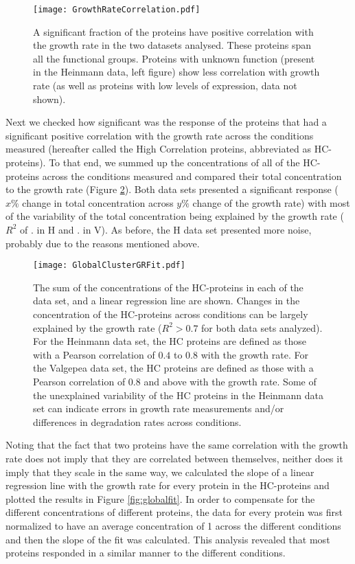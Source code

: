 \documentclass[notitlepage]{article}
\begin{document}
\begin{figure}[h]
\centering
\texttt{[image: GrowthRateCorrelation.pdf]}
\caption{
A significant fraction of the proteins have positive correlation with the growth rate in the two datasets analysed.
These proteins span all the functional groups.
Proteins with unknown function (present in the Heinmann data, left figure) show less correlation with growth rate (as well as proteins with low levels of expression, data not shown).
}
\label{fig:growthcorr}
\end{figure}

Next we checked how significant was the response of the proteins that had a significant positive correlation with the growth rate across the conditions measured (hereafter called the High Correlation proteins, abbreviated as HC-proteins).
To that end, we summed up the concentrations of all of the HC-proteins across the conditions measured and compared their total concentration to the growth rate (Figure \ref{fig:globalgrcorr}).
Both data sets presented a significant response ($x\% $ change in total concentration across $y\% $ change of the growth rate) with most of the variability of the total concentration being explained by the growth rate ($R^2$ of . in H and . in V). 
As before, the H data set presented more noise, probably due to the reasons mentioned above.

\begin{figure}[h]
\centering
\texttt{[image: GlobalClusterGRFit.pdf]}
\caption{
The sum of the concentrations of the HC-proteins in each of the data set, and a linear regression line are shown.
Changes in the concentration of the HC-proteins across conditions can be largely explained by the growth rate ($R^2>0.7$ for both data sets analyzed).
For the Heinmann data set, the HC proteins are defined as those with a Pearson correlation of $0.4$ to $0.8$ with the growth rate.
For the Valgepea data set, the HC proteins are defined as those with a Pearson correlation of $0.8$ and above with the growth rate.
Some of the unexplained variability of the HC proteins in the Heinmann data set can indicate errors in growth rate measurements and/or differences in degradation rates across conditions.
}
\label{fig:globalgrcorr}
\end{figure}

Noting that the fact that two proteins have the same correlation with the growth rate does not imply that they are correlated between themselves, neither does it imply that they scale in the same way, we calculated the slope of a linear regression line with the growth rate for every protein in the HC-proteins and plotted the results in Figure \ref{fig:globalfit}.
In order to compensate for the different concentrations of different proteins, the data for every protein was first normalized to have an average concentration of 1 across the different conditions and then the slope of the fit was calculated.
This analysis revealed that most proteins responded in a similar manner to the different conditions.
\end{document}
